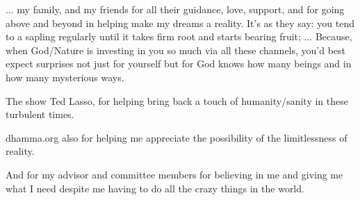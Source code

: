 ... my family, and my friends for all their guidance, love, support, and for going above and beyond in helping make my dreams a reality. It's as they say: you tend to a sapling regularly until it takes firm root and starts bearing fruit; ... Because, when God/Nature is investing in you so much via all these channels, you'd best expect surprises not just for yourself but for God knows how many beings and in how many mysterious ways.

The show Ted Lasso, for helping bring back a touch of humanity/sanity in these turbulent times.

dhamma.org also for helping me appreciate the possibility of the limitlessness of reality.

And for my advisor and committee members for believing in me and giving me what I need despite me having to do all the crazy things in the world.